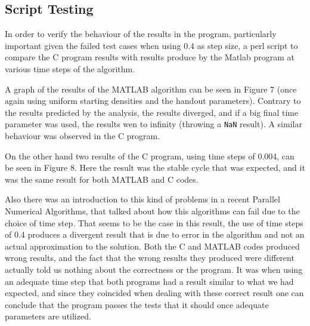 \documentclass[12pt,a4paper]{article}
\begin{document}
\subsection{Script Testing}


In order to verify the behaviour of the results in the program, particularly important given the failed test cases when using 0.4 as step size, a perl script to compare the C program results with results produce by the Matlab program at various time steps of the algorithm. 

A graph of the results of the MATLAB algorithm can be seen in Figure 7 (once again using uniform starting densities and the handout parameters). Contrary to the results predicted by the analysis, the results diverged, and if a big final time parameter was used, the results wen to infinity (throwing a \texttt{NaN} result). A similar behaviour was observed in the C program.

On the other hand two results of the C program, using time steps of 0.004, can be seen in Figure 8. Here the result was the stable cycle that was expected, and it was the same result for both MATLAB and C codes.

Also there was an introduction to this kind of problems in a recent Parallel Numerical Algorithms, that talked about how this algorithms can fail due to the choice of time step. That seems to be the case in this result, the use of time steps of 0.4 produces a divergent result that is due to error in the algorithm and not an actual approximation to the solution. Both the C and MATLAB codes produced wrong results, and the fact that the wrong results they produced were different actually told us nothing about the correctness or the program. It was when using an adequate time step that both programs had a result similar to what we had expected, and since they coincided when dealing with these correct result one can conclude that the program passes the tests that it should once adequate parameters are utilized.
\end{document}
